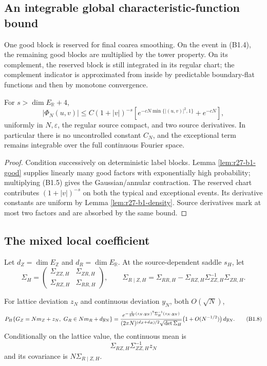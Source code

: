 \subsection{An integrable global characteristic-function bound}

One good block is reserved for final coarea smoothing.  On the event in
(B1.4), the remaining good blocks are multiplied by the tower property.  On
its complement, the reserved block is still integrated in its regular chart;
the complement indicator is approximated from inside by predictable
boundary-flat functions and then by monotone convergence.

\begin{theorem}
\label{thm:r27-b1-damping}
For $s>\dim E_{\mathbb R}+4$,
\[
 |\Phi_N(u,v)|
 \le C(1+|v|)^{-s}
 \left[
 e^{-cN\min\{|(u,v)|^2,1\}}+e^{-cN}\right],              \tag{B1.6}
\]
uniformly in $N,\varepsilon$, the regular source compact, and two source
derivatives.  In particular there is no uncontrolled constant $C_N$, and the
exceptional term remains integrable over the full continuous Fourier space.
\end{theorem}

\begin{proof}
Condition successively on deterministic label blocks.  Lemma
\ref{lem:r27-b1-good} supplies linearly many good factors with exponentially
high probability; multiplying (B1.5) gives the Gaussian/annular contraction.
The reserved chart contributes $(1+|v|)^{-s}$ on both the typical and
exceptional events.  Its derivative constants are uniform by Lemma
\ref{lem:r27-b1-density}.  Source derivatives mark at most two factors and
are absorbed by the same bound.
\end{proof}

\subsection{The mixed local coefficient}

Let $d_Z=\dim E_{\mathbb Z}$ and $d_R=\dim E_{\mathbb R}$.  At the
source-dependent saddle $s_H$, let
\[
 \Sigma_H=
 \begin{pmatrix}
 \Sigma_{ZZ,H}&\Sigma_{ZR,H}\\
 \Sigma_{RZ,H}&\Sigma_{RR,H}
 \end{pmatrix},
 \qquad
 \Sigma_{R\mid Z,H}
 =\Sigma_{RR,H}-\Sigma_{RZ,H}\Sigma_{ZZ,H}^{-1}\Sigma_{ZR,H}.            \tag{B1.7}
\]

\begin{theorem}
\label{thm:r27-b1-llt}
For lattice deviation $z_N$ and continuous deviation $y_N$, both
$O(\sqrt N)$,
\[
 P_H\{G_Z=Nm_Z+z_N,\ G_R\in Nm_R+dy_N\}
 ={e^{-\frac1{2N}(z_N,y_N)^\mathsf T
                 \Sigma_H^{-1}(z_N,y_N)}
   \over(2\pi N)^{(d_Z+d_R)/2}\sqrt{\det\Sigma_H}}
 \bigl(1+O(N^{-1/2})\bigr)\,dy_N.                         \tag{B1.8}
\]
Conditionally on the lattice value, the continuous mean is
\[
 \Sigma_{RZ,H}\Sigma_{ZZ,H}^{-1}z_N
\]
and its covariance is $N\Sigma_{R\mid Z,H}$.
\end{theorem}


